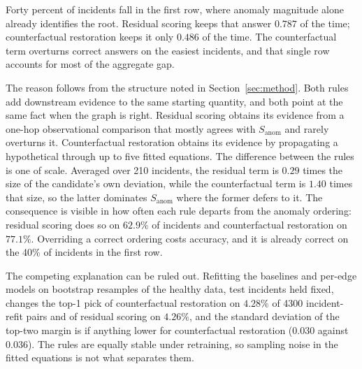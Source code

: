 \documentclass[conference]{IEEEtran}
\begin{document}
\begin{table}[htbp]
\centering
\caption{Top-1 accuracy by anomaly rank of the true root, 860 incidents.}
\label{tab:rank}
\end{table}

Forty percent of incidents fall in the first row, where anomaly magnitude alone already identifies the root. Residual scoring keeps that answer $0.787$ of the time; counterfactual restoration keeps it only $0.486$ of the time. The counterfactual term overturns correct answers on the easiest incidents, and that single row accounts for most of the aggregate gap.

The reason follows from the structure noted in Section~\ref{sec:method}. Both rules add downstream evidence to the same starting quantity, and both point at the same fact when the graph is right. Residual scoring obtains its evidence from a one-hop observational comparison that mostly agrees with $S_{\mathrm{anom}}$ and rarely overturns it. Counterfactual restoration obtains its evidence by propagating a hypothetical through up to five fitted equations. The difference between the rules is one of scale. Averaged over 210 incidents, the residual term is $0.29$ times the size of the candidate's own deviation, while the counterfactual term is $1.40$ times that size, so the latter dominates $S_{\mathrm{anom}}$ where the former defers to it. The consequence is visible in how often each rule departs from the anomaly ordering: residual scoring does so on $62.9\%$ of incidents and counterfactual restoration on $77.1\%$. Overriding a correct ordering costs accuracy, and it is already correct on the 40\% of incidents in the first row.

The competing explanation can be ruled out. Refitting the baselines and per-edge models on bootstrap resamples of the healthy data, test incidents held fixed, changes the top-1 pick of counterfactual restoration on $4.28\%$ of 4300 incident-refit pairs and of residual scoring on $4.26\%$, and the standard deviation of the top-two margin is if anything lower for counterfactual restoration ($0.030$ against $0.036$). The rules are equally stable under retraining, so sampling noise in the fitted equations is not what separates them.
\end{document}
